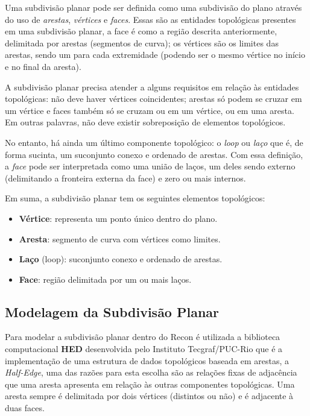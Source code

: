 Uma subdivisão planar pode ser definida como uma subdivisão do plano através do uso de \textit{arestas}, \textit{vértices} e \textit{faces}.\cite{Berg} Essas são as entidades topológicas presentes em uma subdivisão planar, a face é como a região descrita anteriormente, delimitada por arestas (segmentos de curva); os vértices são os limites das arestas, sendo um para cada extremidade (podendo ser o mesmo vértice no início e no final da aresta).

A subdivisão planar precisa atender a alguns requisitos em relação às entidades topológicas: não deve haver vértices coincidentes; arestas só podem se cruzar em um vértice e faces também só se cruzam ou em um vértice, ou em uma aresta. Em outras palavras, não deve existir sobreposição de elementos topológicos. 

No entanto, há ainda um último componente topológico: o \textit{loop} ou \textit{laço} que é, de forma sucinta, um suconjunto conexo e ordenado de arestas. Com essa definição, a \textit{face} pode ser interpretada como uma união de laços, um deles sendo externo (delimitando a fronteira externa da face) e zero ou mais internos.

Em suma, a subdivisão planar tem os seguintes elementos topológicos:
\renewcommand{\labelitemi}{•}
\begin{itemize}
  \item \textbf{Vértice}: representa um ponto único dentro do plano.
  \item \textbf{Aresta}: segmento de curva com vértices como limites.
  \item \textbf{Laço} (loop): suconjunto conexo e ordenado de arestas.
  \item \textbf{Face}: região delimitada por um ou mais laços.
\end{itemize}

\subsection{Modelagem da Subdivisão Planar}

Para modelar a subdivisão planar dentro do Recon é utilizada a biblioteca computacional \textbf{HED} desenvolvida pelo Instituto Tecgraf/PUC-Rio que é a implementação de uma estrutura de dados topológicos baseada em arestas, a \textit{Half-Edge}, uma das razões para esta escolha são as relações fixas de adjacência que uma aresta apresenta em relação às outras componentes topológicas. Uma aresta sempre é delimitada por dois vértices (distintos ou não) e é adjacente à duas faces.\cite{HED}

